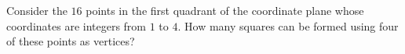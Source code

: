 Consider the $16$ points in the first quadrant of the coordinate plane whose coordinates are integers from $1$ to $4$. How many squares can be formed using four of these points as vertices?

